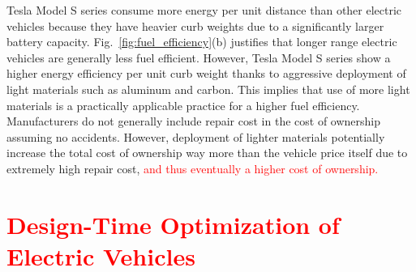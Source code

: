 \documentclass[journal]{IEEEtran}
\begin{document}
Tesla Model S series consume more energy per unit distance than other electric vehicles because they have heavier curb weights due to a significantly larger battery capacity. Fig.~\ref{fig:fuel_efficiency}(b) justifies that longer range electric vehicles are generally less fuel efficient. However, Tesla Model S series show a higher energy efficiency per unit curb weight 
thanks to aggressive deployment of light materials such as aluminum and carbon.  
This implies that use of more light materials is a practically applicable practice for a higher fuel efficiency. Manufacturers do not generally include repair cost in the cost of ownership assuming no accidents. However, deployment of lighter materials potentially increase the total cost of ownership way more than the vehicle price itself due to extremely high repair cost, \textcolor{red}{and thus eventually a higher cost of ownership.} %






\section{\textcolor{red}{Design-Time Optimization of Electric Vehicles}}
\end{document}
